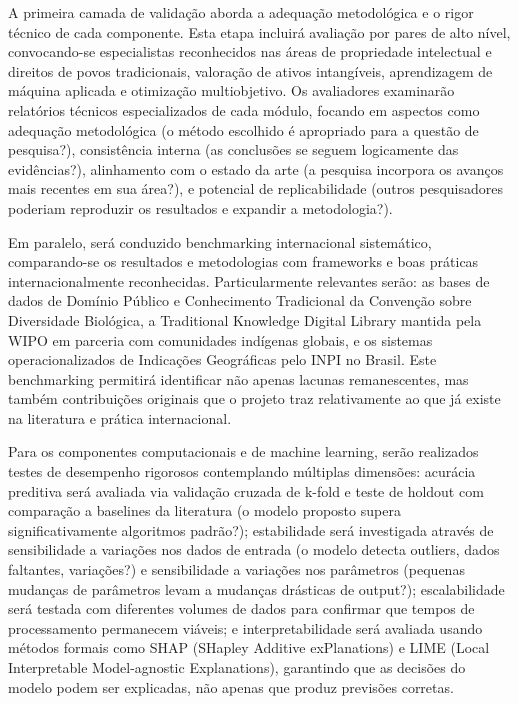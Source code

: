 A primeira camada de validação aborda a adequação metodológica e o rigor técnico de cada componente. Esta etapa incluirá avaliação por pares de alto nível, convocando-se especialistas reconhecidos nas áreas de propriedade intelectual e direitos de povos tradicionais, valoração de ativos intangíveis, aprendizagem de máquina aplicada e otimização multiobjetivo. Os avaliadores examinarão relatórios técnicos especializados de cada módulo, focando em aspectos como adequação metodológica (o método escolhido é apropriado para a questão de pesquisa?), consistência interna (as conclusões se seguem logicamente das evidências?), alinhamento com o estado da arte (a pesquisa incorpora os avanços mais recentes em sua área?), e potencial de replicabilidade (outros pesquisadores poderiam reproduzir os resultados e expandir a metodologia?).

Em paralelo, será conduzido benchmarking internacional sistemático, comparando-se os resultados e metodologias com frameworks e boas práticas internacionalmente reconhecidas. Particularmente relevantes serão: as bases de dados de Domínio Público e Conhecimento Tradicional da Convenção sobre Diversidade Biológica, a Traditional Knowledge Digital Library mantida pela WIPO em parceria com comunidades indígenas globais, e os sistemas operacionalizados de Indicações Geográficas pelo INPI no Brasil. Este benchmarking permitirá identificar não apenas lacunas remanescentes, mas também contribuições originais que o projeto traz relativamente ao que já existe na literatura e prática internacional.

Para os componentes computacionais e de machine learning, serão realizados testes de desempenho rigorosos contemplando múltiplas dimensões: acurácia preditiva será avaliada via validação cruzada de k-fold e teste de holdout com comparação a baselines  da literatura (o modelo proposto supera significativamente algoritmos padrão?); estabilidade será investigada através de sensibilidade a variações nos dados de entrada (o modelo detecta outliers, dados faltantes, variações?) e sensibilidade a variações nos parâmetros (pequenas mudanças de parâmetros levam a mudanças drásticas de output?); escalabilidade será testada com diferentes volumes de dados para confirmar que tempos de processamento permanecem viáveis; e interpretabilidade será avaliada usando métodos formais como SHAP (SHapley Additive exPlanations) e LIME (Local Interpretable Model-agnostic Explanations), garantindo que as decisões do modelo podem ser explicadas, não apenas que produz previsões corretas.

